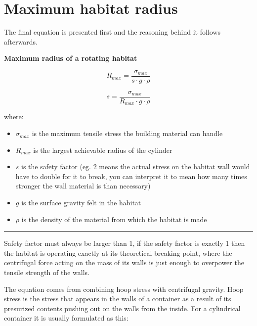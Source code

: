 \documentclass[a4paper]{article}
\begin{document}
	\pagebreak
	
	\section{Maximum habitat radius}
	
	The final equation is presented first and the reasoning behind it follows afterwards.
	
	\begin{center}
		\textbf{Maximum radius of a rotating habitat}
	\end{center}
	
	$$ R_{max} = \frac{\sigma_{max}}{s \cdot g \cdot \rho} $$
	
	$$ s = \frac{\sigma_{max}}{R_{max} \cdot g \cdot \rho} $$
	
	where:
	
	\begin{itemize}
		\item $\sigma_{max}$ is the maximum tensile stress the building material can handle
		
		\item $R_{max}$ is the largest achievable radius of the cylinder
		
		\item $s$ is the safety factor (eg. 2 means the actual stress on the habitat wall would have to double for it to break, you can interpret it to mean how many times stronger the wall material is than necessary)
		
		\item $g$ is the surface gravity felt in the habitat
		
		\item $\rho$ is the density of the material from which the habitat is made
	\end{itemize}
	
	\noindent \rule{\linewidth}{1pt}
	
	\medskip
	
	Safety factor must always be larger than 1, if the safety factor is exactly 1 then the habitat is operating exactly at its theoretical breaking point, where the centrifugal force acting on the mass of its walls is just enough to overpower the tensile strength of the walls.
	
	\pagebreak
	
	The equation comes from combining hoop stress with centrifugal gravity. Hoop stress is the stress that appears in the walls of a container as a result of its presurized contents pushing out on the walls from the inside. For a cylindrical container it is usually formulated as this:
	
\end{document}
